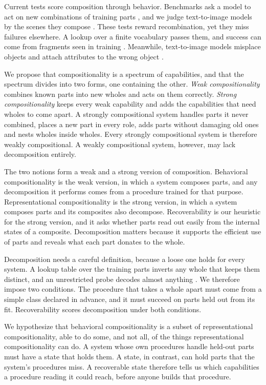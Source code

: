 Current tests score composition through behavior. Benchmarks ask a model to act on new combinations of training parts \citep{lake2018,keysers2020,hupkes2020}, and we judge text-to-image models by the scenes they compose \citep{ramesh2021}. These tests reward recombination, yet they miss failures elsewhere. A lookup over a finite vocabulary passes them, and success can come from fragments seen in training \citep{dziri2023}. Meanwhile, text-to-image models misplace objects \citep{conwell2022} and attach attributes to the wrong object \citep{rassin2022}.

We propose that compositionality is a spectrum of capabilities, and that the spectrum divides into two forms, one containing the other. \emph{Weak compositionality} combines known parts into new wholes and acts on them correctly. \emph{Strong compositionality} keeps every weak capability and adds the capabilities that need wholes to come apart. A strongly compositional system handles parts it never combined, places a new part in every role, adds parts without damaging old ones and nests wholes inside wholes. Every strongly compositional system is therefore weakly compositional. A weakly compositional system, however, may lack decomposition entirely.

The two notions form a weak and a strong version of composition. Behavioral compositionality is the weak version, in which a system composes parts, and any decomposition it performs comes from a procedure trained for that purpose. Representational compositionality is the strong version, in which a system composes parts and its composites also decompose. Recoverability is our heuristic for the strong version, and it asks whether parts read out easily from the internal states of a composite. Decomposition matters because it supports the efficient use of parts and reveals what each part donates to the whole.

Decomposition needs a careful definition, because a loose one holds for every system. A lookup table over the training parts inverts any whole that keeps them distinct, and an unrestricted probe decodes almost anything \citep{hewitt2019}. We therefore impose two conditions. The procedure that takes a whole apart must come from a simple class declared in advance, and it must succeed on parts held out from its fit. Recoverability scores decomposition under both conditions.

We hypothesize that behavioral compositionality is a subset of representational compositionality, able to do some, and not all, of the things representational compositionality can do. A system whose own procedures handle held-out parts must have a state that holds them. A state, in contrast, can hold parts that the system's procedures miss. A recoverable state therefore tells us which capabilities a procedure reading it could reach, before anyone builds that procedure.

